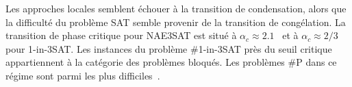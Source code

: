 Les approches locales semblent échouer à la transition de condensation, alors que la difficulté du problème SAT semble provenir de la transition de congélation. La transition de phase critique pour NAE3SAT est situé à $\alpha_{c} \approx 2.1$~\cite{achlioptasPhaseTransition1ink2001} et à $\alpha_{c} \approx 2/3$~\cite{raymondPhaseDiagram1in32007} pour 1-in-3SAT. Les instances du problème \#1-in-3SAT près du seuil critique appartiennent à la catégorie des problèmes bloqués. Les problèmes \#P dans ce régime sont parmi les plus difficiles~\cite{zdeborovaStatisticalPhysicsHard2008}.






